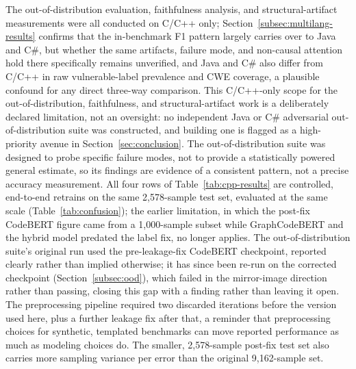 \documentclass{ieeeaccess}
\begin{document}
The out-of-distribution evaluation, faithfulness analysis, and structural-artifact measurements were all conducted on C/C++ only; Section~\ref{subsec:multilang-results} confirms that the in-benchmark F1 pattern largely carries over to Java and C\#, but whether the same artifacts, failure mode, and non-causal attention hold there specifically remains unverified, and Java and C\# also differ from C/C++ in raw vulnerable-label prevalence and CWE coverage, a plausible confound for any direct three-way comparison. This C/C++-only scope for the out-of-distribution, faithfulness, and structural-artifact work is a deliberately declared limitation, not an oversight: no independent Java or C\# adversarial out-of-distribution suite was constructed, and building one is flagged as a high-priority avenue in Section~\ref{sec:conclusion}. The out-of-distribution suite was designed to probe specific failure modes, not to provide a statistically powered general estimate, so its findings are evidence of a consistent pattern, not a precise accuracy measurement. All four rows of Table~\ref{tab:cpp-results} are controlled, end-to-end retrains on the same 2{,}578-sample test set, evaluated at the same scale (Table~\ref{tab:confusion}); the earlier limitation, in which the post-fix CodeBERT figure came from a 1{,}000-sample subset while GraphCodeBERT and the hybrid model predated the label fix, no longer applies. The out-of-distribution suite's original run used the pre-leakage-fix CodeBERT checkpoint, reported clearly rather than implied otherwise; it has since been re-run on the corrected checkpoint (Section~\ref{subsec:ood}), which failed in the mirror-image direction rather than passing, closing this gap with a finding rather than leaving it open. The preprocessing pipeline required two discarded iterations before the version used here, plus a further leakage fix after that, a reminder that preprocessing choices for synthetic, templated benchmarks can move reported performance as much as modeling choices do. The smaller, 2{,}578-sample post-fix test set also carries more sampling variance per error than the original 9{,}162-sample set.
\end{document}
